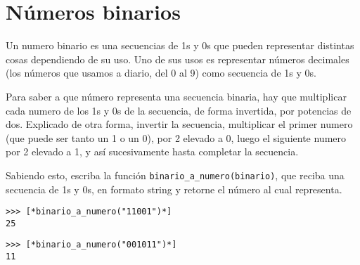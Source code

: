 \section{Números binarios}

Un numero binario es una secuencias de 1s y 0s que pueden representar distintas cosas dependiendo de su uso. Uno de sus usos es representar números decimales (los números que usamos a diario, del 0 al 9) como secuencia de 1s y 0s.

Para saber a que número representa una secuencia binaria, hay que multiplicar cada numero de los 1s y 0s de la secuencia, de forma invertida, por potencias de dos. Explicado de otra forma, invertir la secuencia, multiplicar el primer numero (que puede ser tanto un 1 o un 0), por 2 elevado a 0, luego el siguiente numero por 2 elevado a 1, y así sucesivamente hasta completar la secuencia.

Sabiendo esto, escriba la función \texttt{binario\_a\_numero(binario)}, que reciba una secuencia de 1s y 0s, en formato string y retorne el número al cual representa. 

\begin{lstlisting}[style=consola]
>>> [*binario_a_numero("11001")*]
25
\end{lstlisting}

\begin{lstlisting}[style=consola]
>>> [*binario_a_numero("001011")*]
11
\end{lstlisting}
